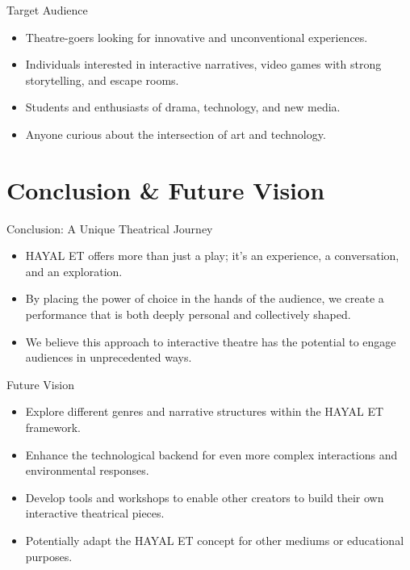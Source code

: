 \documentclass[aspectratio=169]{beamer}
\begin{document}
\begin{frame}{Target Audience}
    \begin{itemize}
        \item Theatre-goers looking for innovative and unconventional experiences.
        \item Individuals interested in interactive narratives, video games with strong storytelling, and escape rooms.
        \item Students and enthusiasts of drama, technology, and new media.
        \item Anyone curious about the intersection of art and technology.
    \end{itemize}
\end{frame}


\section{Conclusion & Future Vision}
\begin{frame}{Conclusion: A Unique Theatrical Journey}
    \begin{itemize}
        \item HAYAL ET offers more than just a play; it's an experience, a conversation, and an exploration.
        \item By placing the power of choice in the hands of the audience, we create a performance that is both deeply personal and collectively shaped.
        \item We believe this approach to interactive theatre has the potential to engage audiences in unprecedented ways.
    \end{itemize}
\end{frame}

\begin{frame}{Future Vision}
    \begin{itemize}
        \item Explore different genres and narrative structures within the HAYAL ET framework.
        \item Enhance the technological backend for even more complex interactions and environmental responses.
        \item Develop tools and workshops to enable other creators to build their own interactive theatrical pieces.
        \item Potentially adapt the HAYAL ET concept for other mediums or educational purposes.
    \end{itemize}
\end{frame}
\end{document}
